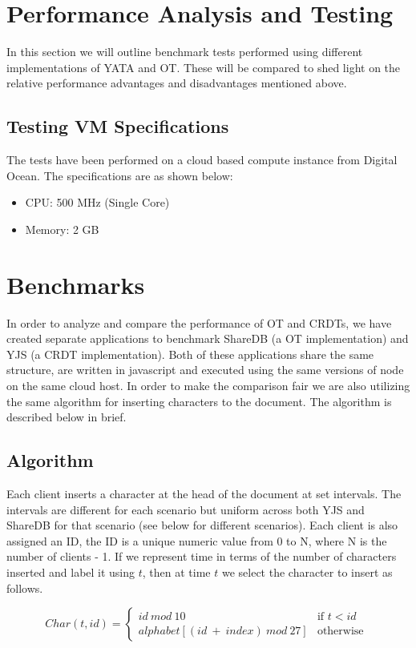 \documentclass[12pt]{article}
\begin{document}
  \section{Performance Analysis and Testing}
  In this section we will outline benchmark tests performed using different implementations of YATA and OT.
  These will be compared to shed light on the relative performance advantages and disadvantages mentioned above.
  
  \subsection{Testing VM Specifications}
  The tests have been performed on a cloud based compute instance from Digital Ocean.
  The specifications are as shown below:
  \begin{itemize}
    \item CPU: 500 MHz (Single Core)
    \item Memory: 2 GB
  \end{itemize}

  \section*{Benchmarks}
  In order to analyze and compare the performance of OT and CRDTs, we have created separate applications to benchmark ShareDB (a OT implementation) and YJS (a CRDT implementation).
  Both of these applications share the same structure, are written in javascript and executed using the same versions of node on the same cloud host.
  In order to make the comparison fair we are also utilizing the same algorithm for inserting characters to the document. The algorithm is described below in brief.

  \subsection{Algorithm}
  Each client inserts a character at the head of the document at set intervals. The intervals are different for each scenario but uniform across both YJS and ShareDB for that scenario (see below for different scenarios).
  Each client is also assigned an ID, the ID is a unique numeric value from 0 to N, where N is the number of clients - 1.
  If we represent time in terms of the number of characters inserted and label it using \(t\), then at time \(t\) we select the character to insert as follows.
  
  \begin{equation} \label{insertion_algorithm_character}
    Char(t, id) =
    \left\{
	    \begin{array}{ll}
		    id\ mod\ 10 & \mbox{if } t < id \\
        alphabet[(id\ +\ index)\ mod\ 27] & \mbox{otherwise }
	    \end{array}
    \right.
  \end{equation}
\end{document}
